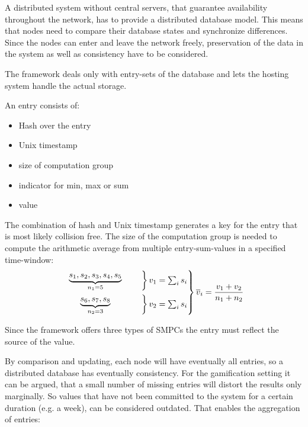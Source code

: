 		A distributed system without central servers, that guarantee availability throughout the network, has to provide a distributed database model. This means that nodes need to compare their database states and synchronize differences. Since the nodes can enter and leave the network freely, preservation of the data in the system as well as consistency have to be considered.
		
		The framework deals only with entry-sets of the database and lets the hosting system handle the actual storage.
		
		\noindent An entry consists of:
		\begin{itemize}
			\item Hash over the entry
			\item Unix timestamp
			\item size of computation group
			\item indicator for min, max or sum
			\item value
		\end{itemize}
		
		The combination of hash and Unix timestamp generates a key for the entry that is most likely collision free. The size of the computation group is needed to compute the arithmetic average from multiple entry-sum-values in a specified time-window: 
		\begin{align*}
			\begin{rcases*}
				\begin{rcases*}
					\mathmakebox[2.5cm][c]{ \underbrace{s_1, s_2, s_3, s_4, s_5}_{n_1=5} }  & \quad
				\end{rcases*} v_1=\sum_{i}s_i \\
				\begin{rcases*}
					\mathmakebox[2.5cm][c]{ \underbrace{s_6, s_7, s_8}_{n_2=3} } & \quad
				\end{rcases*} v_2=\sum_{i}s_i
			\end{rcases*} \overline{v}_i=\frac{v_1+v_2}{n_1+n_2}
		\end{align*}
		 
		Since the framework offers three types of \gls{SMPC}s the entry must reflect the source of the value.

		By comparison and updating, each node will have eventually all entries, so a distributed database has eventually consistency. 
		For the gamification setting it can be argued, that a small number of missing entries will distort the results only marginally. So values that have not been committed to the system for a certain duration (e.g. a week), can be considered outdated. That enables the aggregation of entries:
		
